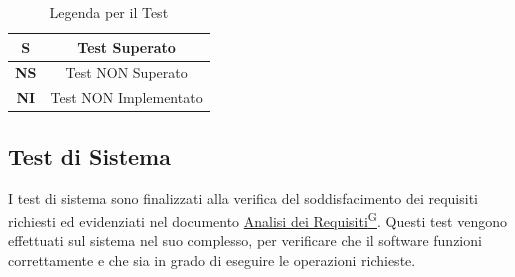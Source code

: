 \documentclass{article}
\begin{document}
\begin{table}[H]
    \centering
    \renewcommand{\arraystretch}{1.5}
\begin{tabular}{|c|c|}
    \hline
    \textbf{S} & Test Superato \\
    \hline
    \textbf{NS} & Test NON Superato \\
    \hline
    \textbf{NI} & Test NON Implementato \\
    \hline
\end{tabular}
\caption{Legenda per il Test}
\end{table}


\subsection{Test di Sistema} %
I test di sistema sono finalizzati alla verifica del soddisfacimento dei requisiti richiesti ed evidenziati nel documento
\href{https://code7crusaders.github.io/docs/RTB/documentazione_interna/glossario.html#analisi-dei-requisiti}{Analisi dei Requisiti\textsuperscript{G}}. Questi test vengono effettuati sul sistema nel suo complesso, per verificare che il software funzioni correttamente
e che sia in grado di eseguire le operazioni richieste.

\renewcommand{\arraystretch}{1.5}  %
\end{document}
